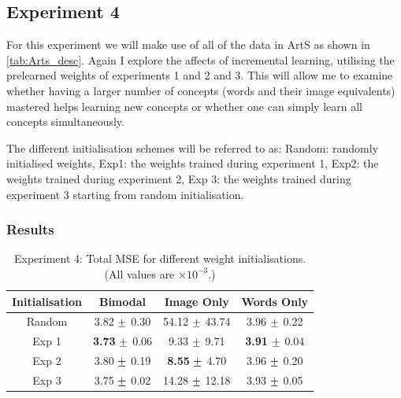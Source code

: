 \newpage
\subsection{Experiment 4}
For this experiment we will make use of all of the data in ArtS as shown in \autoref{tab:Arts_desc}. Again I explore the affects of incremental learning, utilising the prelearned weights of experiments 1 and 2 and 3. This will allow me to examine whether having a larger number of concepts (words and their image equivalents) mastered  helps learning new concepts or whether one can simply learn all concepts simultaneously.

The different initialisation schemes will be referred to as: Random: randomly initialised weights, Exp1: the weights trained during experiment 1, Exp2: the weights trained during experiment 2, Exp 3: the weights trained during experiment 3 starting from random initialisation.
%

\subsubsection{Results}

\begin{table}[h!]
\centering
	\begin{tabular}{|c|c|c|c|}
	\hline
	\textbf{Initialisation} & 	\textbf{Bimodal} & 	\textbf{Image Only} 	& 	\textbf{Words Only} \\ \hline
Random 	&	3.82	$\mypm$	0.30	&	54.12	$\mypm$	43.74	&	3.96	$\mypm$	0.22	\\ \hline
Exp 1	&	\textbf{3.73}	$\mypm$	0.06	&	9.33	$\mypm$	9.71	&	\textbf{3.91}	$\mypm$	0.04\\ \hline
Exp 2	&	3.80	$\mypm$	0.19	&	\textbf{8.55}	$\mypm$	4.70	&	3.96	$\mypm$	0.20	\\ \hline
Exp 3	&	3.75	$\mypm$	0.02	&	14.28	$\mypm$	12.18	&	3.93	$\mypm$	0.05	\\ \hline

	\end{tabular}
\caption{Experiment 4: Total MSE for different weight initialisations. (All values are $\times10^{-3}$.)}
\label{tab:res739}
\end{table}

